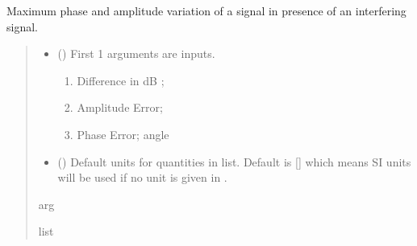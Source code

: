 \documentclass[letterpaper,10pt,english]{sphinxmanual}
\begin{document}
\begin{fulllineitems}
\label{\detokenize{components:components.Interference_Phase_Amp_Error}}
\pysigstartsignatures
{}
\pysigstopsignatures
\sphinxAtStartPar
Maximum phase and amplitude variation of a signal in presence of an interfering signal.
\begin{quote}\begin{description}
\begin{itemize}
\item {}
\sphinxAtStartPar
{} () \textendash{}
\sphinxAtStartPar
First 1 arguments are inputs.
\begin{enumerate}
%
\item {}
\sphinxAtStartPar
Difference in dB ;

\item {}
\sphinxAtStartPar
Amplitude Error;

\item {}
\sphinxAtStartPar
Phase Error; angle

\end{enumerate}


\item {}
\sphinxAtStartPar
{} (\sphinxstyleliteralemphasis{\sphinxupquote{, }}) \textendash{} Default units for quantities in  list. Default is {[}{]} which means SI units will be used if no unit is given in .

\end{itemize}

\sphinxAtStartPar
arg

\sphinxAtStartPar
list

\end{description}\end{quote}

\end{fulllineitems}

\end{document}
